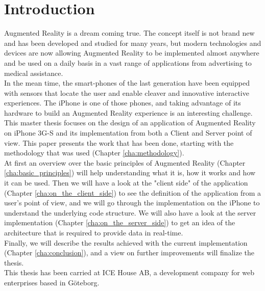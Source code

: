 \chapter{Introduction}
\label{cha:introduction}

Augmented Reality is a dream coming true. The concept itself is not brand new and has been developed and studied for many years, but modern technologies and devices are now allowing Augmented Reality to be implemented almost anywhere and be used on a daily basis in a vast range of applications from advertising to medical assistance.\\

In the mean time, the smart-phones of the last generation have been equipped with sensors that locate the user and enable cleaver and innovative interactive experiences. The iPhone is one of those phones, and taking advantage of its hardware to build an Augmented Reality experience is an interesting challenge.\\

This master thesis focuses on the design of an application of Augmented Reality on iPhone 3G-S and its implementation from both a Client and Server point of view. This paper presents the work that has been done, starting with the methodology that was used (Chapter \ref{cha:methodology}).\\

At first an overview over the basic principles of Augmented Reality (Chapter \ref{cha:basic_principles}) will help understanding what it is, how it works and how it can be used. Then we will have a look at the "client side" of the application (Chapter \ref{cha:on_the_client_side}) to see the definition of the application from a user's point of view, and we will go through the implementation on the iPhone to understand the underlying code structure. We will also have a look at the server implementation (Chapter \ref{cha:on_the_server_side}) to get an idea of the architecture that is required to provide data in real-time.\\

Finally, we will describe the results achieved with the current implementation (Chapter \ref{cha:conclusion}), and a view on further improvements will finalize the thesis.\\

This thesis has been carried at ICE House AB, a development company for web enterprises based in Göteborg. 
